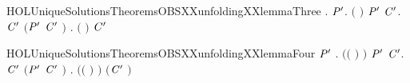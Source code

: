 \newcommand{\HOLUniqueSolutionsTheoremsOBSXXunfoldingXXlemmaTwo}{\UseVerbatim{HOLUniqueSolutionsTheoremsOBSXXunfoldingXXlemmaTwo}}
\begin{SaveVerbatim}{HOLUniqueSolutionsTheoremsOBSXXunfoldingXXlemmaThree}
\HOLTokenTurnstile{} \HOLSymConst{\HOLTokenForall{}} .
         \HOLSymConst{\HOLTokenConj{}}   \HOLSymConst{\HOLTokenImp{}}
       \HOLSymConst{\HOLTokenForall{}}  \ensuremath{\HOLBoundVar{P}\sp{\prime}}.
            \ensuremath{(} \ensuremath{)} \HOLTokenTransBegin{}\HOLTokenTransEnd \ensuremath{\HOLBoundVar{P}\sp{\prime}} \HOLSymConst{\HOLTokenImp{}}
           \HOLSymConst{\HOLTokenExists{}}\ensuremath{\HOLBoundVar{C}\sp{\prime}}.  \ensuremath{\HOLBoundVar{C}\sp{\prime}} \HOLSymConst{\HOLTokenConj{}} \ensuremath{(}\ensuremath{\HOLBoundVar{P}\sp{\prime}} \HOLSymConst{\ensuremath{=}} \ensuremath{\HOLBoundVar{C}\sp{\prime}} \ensuremath{)} \HOLSymConst{\HOLTokenConj{}} \HOLSymConst{\HOLTokenForall{}}.  \ensuremath{(} \ensuremath{)} \HOLTokenTransBegin{}\HOLTokenTransEnd \ensuremath{\HOLBoundVar{C}\sp{\prime}} 
\end{SaveVerbatim}
\newcommand{\HOLUniqueSolutionsTheoremsOBSXXunfoldingXXlemmaThree}{\UseVerbatim{HOLUniqueSolutionsTheoremsOBSXXunfoldingXXlemmaThree}}
\begin{SaveVerbatim}{HOLUniqueSolutionsTheoremsOBSXXunfoldingXXlemmaFour}
\HOLTokenTurnstile{} \HOLSymConst{\HOLTokenForall{}}    \ensuremath{\HOLBoundVar{P}\sp{\prime}} .
         \HOLSymConst{\HOLTokenConj{}}   \HOLSymConst{\HOLTokenConj{}}  \ensuremath{(}\ensuremath{(} \HOLConst{\HOLTokenCompose}   \ensuremath{)} \ensuremath{)}  \ensuremath{\HOLBoundVar{P}\sp{\prime}} \HOLSymConst{\HOLTokenConj{}}
         \HOLSymConst{\HOLTokenLeq{}}  \HOLSymConst{\HOLTokenImp{}}
       \HOLSymConst{\HOLTokenExists{}}\ensuremath{\HOLBoundVar{C}\sp{\prime}}.
            \ensuremath{\HOLBoundVar{C}\sp{\prime}} \HOLSymConst{\HOLTokenConj{}} \ensuremath{(}\ensuremath{\HOLBoundVar{P}\sp{\prime}} \HOLSymConst{\ensuremath{=}} \ensuremath{\HOLBoundVar{C}\sp{\prime}} \ensuremath{)} \HOLSymConst{\HOLTokenConj{}}
           \HOLSymConst{\HOLTokenForall{}}.  \ensuremath{(}\ensuremath{(} \HOLConst{\HOLTokenCompose}   \ensuremath{)} \ensuremath{)}  \ensuremath{(}\ensuremath{\HOLBoundVar{C}\sp{\prime}} \ensuremath{)}
\end{SaveVerbatim}
